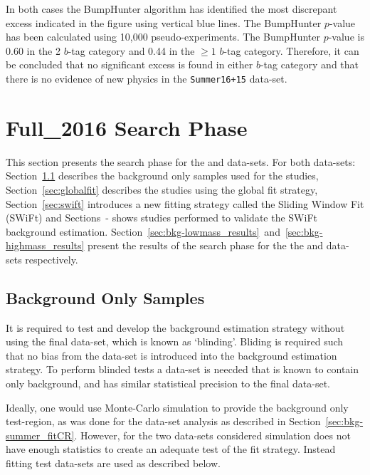In both cases the BumpHunter algorithm has identified the most discrepant excess indicated
in the figure using vertical blue lines.
The BumpHunter $p$-value has been calculated using 10,000 pseudo-experiments.
The BumpHunter $p$-value is 0.60 in the 2 $b$-tag category
and 0.44 in the $\geq1$ $b$-tag category.
Therefore, it can be concluded that no significant excess is found in either $b$-tag category
and that there is no evidence of new physics in the \verb|Summer16+15| data-set.

\section{Full\_2016 Search Phase}
\label{sec:bkg-full}

This section presents the search phase for the \hm{} and \lm{} data-sets.
For both data-sets:
Section~\ref{sec:stat:bkgsample} describes the background only samples used for the studies,
Section~\ref{sec:globalfit} describes the studies using the global fit strategy,
Section~\ref{sec:swift} introduces a new fitting strategy called the Sliding Window Fit (SWiFt)
and Sections~\label{sec:windowSel}-\label{sec:signalInj} shows studies performed to validate the SWiFt background estimation.
Section~\ref{sec:bkg-lowmass_results}~and~\ref{sec:bkg-highmass_results} present the results of the search phase
for the the \hm{} and \lm{} data-sets respectively.

\subsection{Background Only Samples}
\label{sec:stat:bkgsample}

It is required to test and develop the background estimation strategy without using the final data-set, which is known as `blinding'.
Bliding is required such that no bias from the data-set is introduced into the background estimation strategy.
To perform blinded tests a data-set is neecded that is known to contain only background, and has similar statistical precision to the final data-set.

Ideally, one would use Monte-Carlo simulation to provide the background only test-region,
as was done for the \summer{} data-set analysis as described in Section~\ref{sec:bkg-summer_fitCR}.
However, for the two data-sets considered simulation does not have enough statistics to create an adequate test of the fit strategy.
Instead fitting test data-sets are used as described below.

